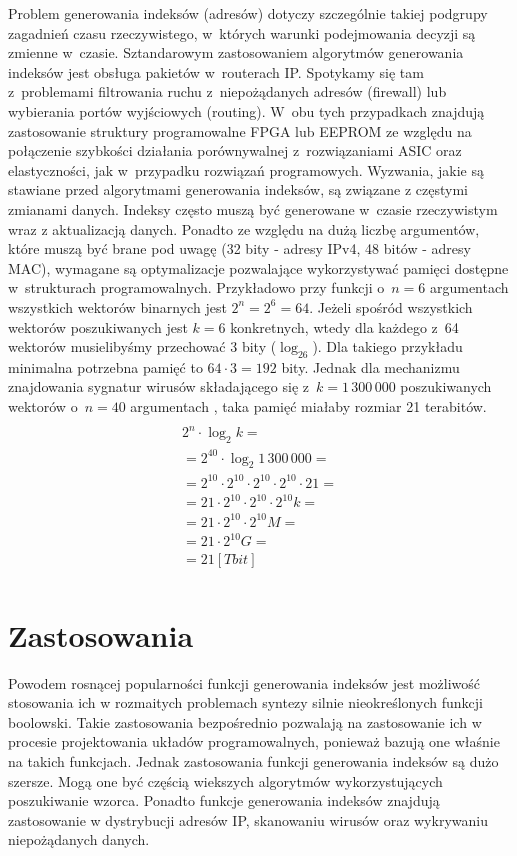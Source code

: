 Problem generowania indeksów (adresów) dotyczy szczególnie takiej podgrupy zagadnień czasu rzeczywistego,
w~których warunki podejmowania decyzji są zmienne w~czasie.
Sztandarowym zastosowaniem algorytmów generowania indeksów jest obsługa pakietów w~routerach IP.
Spotykamy się tam z~problemami filtrowania ruchu z~niepożądanych adresów (firewall) lub wybierania portów wyjściowych (routing).
W~obu tych przypadkach znajdują zastosowanie struktury programowalne FPGA lub EEPROM
ze względu na połączenie szybkości działania porównywalnej z~rozwiązaniami ASIC oraz elastyczności,
jak w~przypadku rozwiązań programowych.
Wyzwania,
jakie są stawiane przed algorytmami generowania indeksów,
są związane z częstymi zmianami danych.
Indeksy często muszą być generowane w~czasie rzeczywistym wraz z aktualizacją danych.
Ponadto ze względu na dużą liczbę argumentów,
które muszą być brane pod uwagę (32 bity - adresy IPv4, 48 bitów - adresy MAC),
wymagane są optymalizacje pozwalające wykorzystywać pamięci dostępne w~strukturach programowalnych.
Przykładowo przy funkcji o~$n=6$ argumentach wszystkich wektorów binarnych jest $2^n = 2^6 = 64$.
Jeżeli spośród wszystkich wektorów poszukiwanych jest $k=6$ konkretnych, wtedy dla każdego z~64 wektorów musielibyśmy przechować 3 bity ($\log_26$).
Dla takiego przykładu minimalna potrzebna pamięć to $64 \cdot 3 = 192$ bity.
Jednak dla mechanizmu znajdowania sygnatur wirusów składającego się z~$k=1\,300\,000$ poszukiwanych wektorów o~$n=40$ argumentach \cite{wirusy}, taka pamięć miałaby rozmiar 21 terabitów.
\begin{multline} \\
2^n \cdot \log_2 k = \\
= 2^{40} \cdot \log_2 1\,300\,000 = \\
= 2^{10} \cdot 2^{10} \cdot 2^{10} \cdot 2^{10} \cdot 21 = \\
=21 \cdot 2^{10} \cdot 2^{10} \cdot 2^{10} k = \\
=21 \cdot 2^{10} \cdot 2^{10} M = \\
=21 \cdot 2^{10} G = \\
=21 [Tbit] \\
\end{multline}

\section{Zastosowania}

Powodem rosnącej popularności funkcji generowania indeksów jest możliwość stosowania ich w rozmaitych problemach syntezy silnie nieokreślonych funkcji boolowski.
Takie zastosowania bezpośrednio pozwalają na zastosowanie ich w procesie projektowania układów programowalnych,
ponieważ bazują one właśnie na takich funkcjach.
Jednak zastosowania funkcji generowania indeksów są dużo szersze.
Mogą one być częścią wiekszych algorytmów wykorzystujących poszukiwanie wzorca.
Ponadto funkcje generowania indeksów znajdują zastosowanie w dystrybucji adresów IP,
skanowaniu wirusów oraz wykrywaniu niepożądanych danych.

